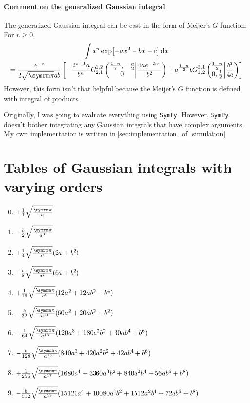 \paragraph{Comment on the generalized Gaussian integral} The generalized Gaussian integral can be cast in the form of Meijer's $G$ function. For $n \geq 0$,
\begin{multline}
    \int x^n\exp[-ax^2 - bx - c]\dd{x} \\= \frac{e^{-c}}{2\sqrt{\cpi}ab}\left[- \frac{2^{n + 1}a}{b^n} {G_{2, 1}^{1, 2}\left(\begin{matrix} \frac{1 - n}{2}, - \frac{n}{2}  \\0 \end{matrix} \middle| {\frac{4 a e^{- 2 i \pi}}{b^{2}}} \right)} + a^{\frac{1 - n}{2}}b {G_{1, 2}^{2, 1}\left(\begin{matrix} \frac{1 - n}{2}\\0, \frac{1}{2}\end{matrix} \middle| {\frac{b^{2}}{4 a}} \right)}\right]
\end{multline}
However, this form isn't that helpful because the Meijer's $G$ function is defined with integral of products.

Originally, I was going to evaluate everything using \texttt{SymPy}. However, \texttt{SymPy} doesn't bother integrating any Gaussian integrals that have complex arguments. My own implementation is written in \cref{sec:implementation_of_simulation} 

\section{Tables of Gaussian integrals with varying orders}
\label{sec:table_of_gaussian_integrals}

\everymath{\displaystyle}
\begin{enumerate}[label = {$\zeta_\arabic*$:}]
    \setcounter{enumi}{-1}
    \item $+\frac{1}{1}\sqrt{\frac{\cpi}{a}}$
    \item $-\frac{b}{2}\sqrt{\frac{\cpi}{a^3}}$
    \item $+\frac{1}{4}\sqrt{\frac{\cpi}{a^5}} (2a + b^2)$
    \item $-\frac{b}{8}\sqrt{\frac{\cpi}{a^7}} (6a + b^2)$
    \item $+\frac{1}{16}\sqrt{\frac{\cpi}{a^9}} (12a^2 + 12ab^2 + b^4)$
    \item $-\frac{b}{32}\sqrt{\frac{\cpi}{a^{11}}} (60a^2 + 20ab^2 + b^2)$
    \item $+\frac{1}{64}\sqrt{\frac{\cpi}{a^{13}}} (120a^3 + 180a^2b^2 + 30ab^4 + b^6)$
    \item $-\frac{b}{128}\sqrt{\frac{\cpi}{a^{15}}} (840a^3 + 420a^2b^2 + 42ab^4 + b^6)$
    \item $+\frac{1}{256}\sqrt{\frac{\cpi}{a^{17}}} (1680a^4 + 3360a^3b^2 + 840a^2b^4 + 56ab^6 + b^8)$
    \item $-\frac{b}{512}\sqrt{\frac{\cpi}{a^{19}}} (15120a^4 + 10080a^3b^2 + 1512a^2b^4 + 72ab^6 + b^8)$
\end{enumerate}